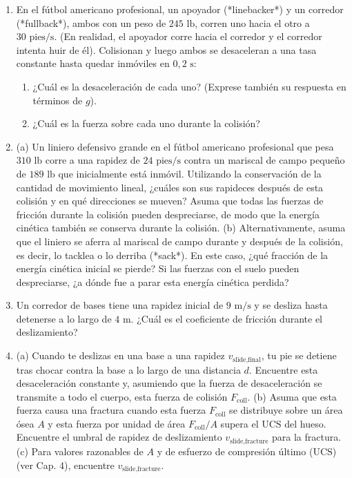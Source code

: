 \documentclass[12pt]{book}
\begin{document}
\begin{enumerate}
\item[3.142] En el fútbol americano profesional, un apoyador (*linebacker*) y un corredor (*fullback*), ambos con un peso de $245\text{ lb}$, corren uno hacia el otro a $30\text{ pies/s}$. (En realidad, el apoyador corre hacia el corredor y el corredor intenta huir de él). Colisionan y luego ambos se desaceleran a una tasa constante hasta quedar inmóviles en $0{,}2\text{ s}$:
\begin{enumerate}
\item[(a)] ¿Cuál es la desaceleración de cada uno? (Exprese también su respuesta en términos de $g$).
\item[(b)] ¿Cuál es la fuerza sobre cada uno durante la colisión?
\end{enumerate}

\item[3.143] (a) Un liniero defensivo grande en el fútbol americano profesional que pesa $310\text{ lb}$ corre a una rapidez de $24\text{ pies/s}$ contra un mariscal de campo pequeño de $189\text{ lb}$ que inicialmente está inmóvil. Utilizando la conservación de la cantidad de movimiento lineal, ¿cuáles son sus rapideces después de esta colisión y en qué direcciones se mueven? Asuma que todas las fuerzas de fricción durante la colisión pueden despreciarse, de modo que la energía cinética también se conserva durante la colisión.
\newline
(b) Alternativamente, asuma que el liniero se aferra al mariscal de campo durante y después de la colisión, es decir, lo tacklea o lo derriba (*sack*). En este caso, ¿qué fracción de la energía cinética inicial se pierde? Si las fuerzas con el suelo pueden despreciarse, ¿a dónde fue a parar esta energía cinética perdida?

\item[3.144] Un corredor de bases tiene una rapidez inicial de $9\text{ m/s}$ y se desliza hasta detenerse a lo largo de $4\text{ m}$. ¿Cuál es el coeficiente de fricción durante el deslizamiento?

\item[3.145] (a) Cuando te deslizas en una base a una rapidez $v_{\text{slide,final}}$, tu pie se detiene tras chocar contra la base a lo largo de una distancia $d$. Encuentre esta desaceleración constante y, asumiendo que la fuerza de desaceleración se transmite a todo el cuerpo, esta fuerza de colisión $F_{\text{coll}}$.
\newline
(b) Asuma que esta fuerza causa una fractura cuando esta fuerza $F_{\text{coll}}$ se distribuye sobre un área ósea $A$ y esta fuerza por unidad de área $F_{\text{coll}}/A$ supera el $\text{UCS}$ del hueso. Encuentre el umbral de rapidez de deslizamiento $v_{\text{slide,fracture}}$ para la fractura.
\newline
(c) Para valores razonables de $A$ y de esfuerzo de compresión último ($\text{UCS}$) (ver Cap. 4), encuentre $v_{\text{slide,fracture}}$.


\end{enumerate}
\end{document}
